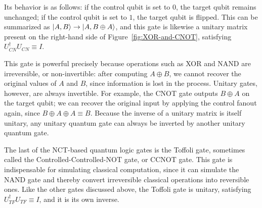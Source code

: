 Its behavior is as follows: if the control qubit is set to $0$, the target qubit remains unchanged; if the control qubit is set to $1$, the target qubit is flipped. This can be summarized as $\ket{A, B} \rightarrow \ket{A, B \oplus A}$, and this gate is likewise a unitary matrix present on the right-hand side of Figure~\ref{fig:XOR-and-CNOT}, satisfying $U_{CN}^{\dagger}U_{CN} \equiv I$.

This gate is powerful precisely because operations such as XOR and NAND are irreversible, or non-invertible: after computing $A \oplus B$, we cannot recover the original values of $A$ and $B$, since information is lost in the process. Unitary gates, however, are always invertible. For example, the CNOT gate outputs $B \oplus A$ on the target qubit; we can recover the original input by applying the control fanout again, since $B \oplus A \oplus A \equiv B$. Because the inverse of a unitary matrix is itself unitary, any unitary quantum gate can always be inverted by another unitary quantum gate.

The last of the NCT-based quantum logic gates is the Toffoli gate, sometimes called the Controlled-Controlled-NOT gate, or CCNOT gate. This gate is indispensable for simulating classical computation, since it can simulate the NAND gate and thereby convert irreversible classical operations into reversible ones. Like the other gates discussed above, the Toffoli gate is unitary, satisfying $U_{TF}^{\dagger}U_{TF} \equiv I$, and it is its own inverse.

